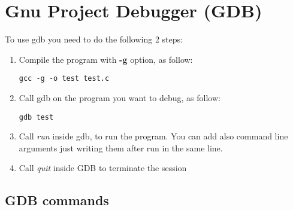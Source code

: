 \chapter{Gnu Project Debugger (GDB)}
To use gdb you need to do the following 2 steps:
\begin{enumerate}
\item{Compile the program with \textbf{-g} option, as follow:
\begin{lstlisting}[linewidth=120pt, basicstyle=\footnotesize\sffamily,]
gcc -g -o test test.c
\end{lstlisting}
}
\item{Call gdb on the program you want to debug, as follow:
\begin{lstlisting}[linewidth=40pt, basicstyle=\footnotesize\sffamily,]
gdb test
\end{lstlisting}
}
\item{Call \textit{run} inside gdb, to run the program. You can add also command line arguments just writing them after run in the same line.
}
\item{Call \textit{quit} inside GDB to terminate the session}
\end{enumerate}
\section{GDB commands}
